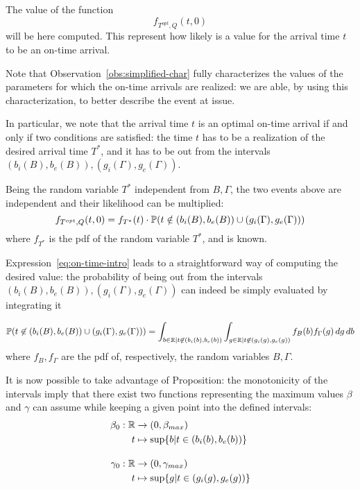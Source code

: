 The value of the function
\begin{equation*}
  f_{T^{opt}, Q}(t, 0)
\end{equation*}
will be here computed.
This represent how likely is a value for the arrival time \(t\) to be an on-time arrival.

Note that Observation~\ref{obs:simplified-char} fully characterizes the values of the parameters for which the on-time arrivals are realized:
we are able, by using this characterization, to better describe the event at issue.

In particular, we note that the arrival time \(t\) is an optimal on-time arrival if and only if two conditions are satisfied:
the time \(t\) has to be a realization of the desired arrival time \(T^*\),
and it has to  be out from the intervals \((b_i(B), b_e(B)), (g_i(\Gamma), g_e(\Gamma))\).

Being the random variable \(T^*\) independent from \(B, \Gamma\),
the two events above are independent and their likelihood can be multiplied:
\begin{equation}
  \label{eq:on-time-intro}
  f_{T^{opt}, Q}(t, 0) = f_{T^*}(t) \cdot \mathbb{P}(t \notin (b_i(B), b_e(B)) \cup (g_i(\Gamma), g_e(\Gamma)))
\end{equation}
where \(f_{T^*}\) is the pdf of the random variable \(T^*\), and is known.

Expression~\eqref{eq:on-time-intro} leads to a straightforward way of computing the desired value:
the probability of being out from the intervals \((b_i(B), b_e(B)), (g_i(\Gamma), g_e(\Gamma))\) can indeed be simply evaluated by integrating it

\begin{equation}
  \label{eq:prob-not-intervals}
  \mathbb{P}( t \not\in (b_i(B), b_e(B)) \cup (g_i(\Gamma), g_e(\Gamma))) = \int_{b\in \mathbb{R} \vert t \not\in (b_i(b), b_e(b))}\int_{g \in \mathbb{R} \vert t \not\in (g_i(g), g_e(g))}f_B(b)f_\Gamma(g)\, dg\, db
\end{equation}
where \(f_B, f_\Gamma\) are the pdf of, respectively, the random variables \(B, \Gamma\).


It is now possible to take advantage of Proposition:
the monotonicity of the intervals imply that there exist two functions representing the maximum values \(\beta\) and \(\gamma\) can assume while keeping a given point into the defined intervals:
\begin{equation}
  \label{eq:def_b_0_g_0}
  \begin{split}
    \beta_0:\mathbb{R}&\rightarrow(0, \beta_{max}) \\
    t&\mapsto \sup\{b | t \in (b_i(b), b_e(b))\} \\[1em]
    \gamma_0:\mathbb{R}&\rightarrow(0, \gamma_{max}) \\
    t&\mapsto \sup\{g | t \in (g_i(g), g_e(g))\}
  \end{split}
\end{equation}

